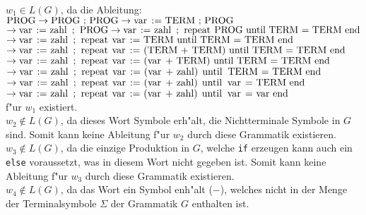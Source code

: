 \documentclass[a4paper,12pt]{article}
\begin{document}

$ w_1 \in L(G) $, da die Ableitung: \\
$ \text{\lstinline|PROG|} \rightarrow \text{\lstinline|PROG ; PROG|} \rightarrow \text{\lstinline|var := TERM ; PROG|} $ \\
$ \rightarrow \text{\lstinline|var := zahl ; PROG|} \rightarrow \text{\lstinline|var := zahl ; repeat PROG until TERM = TERM end|} $ \\
$ \rightarrow \text{\lstinline|var := zahl ; repeat var := TERM until TERM = TERM end |} $ \\
$ \rightarrow \text{\lstinline|var := zahl ; repeat var := (TERM + TERM) until TERM = TERM end |}  $ \\
$ \rightarrow \text{\lstinline|var := zahl ; repeat var := (var + TERM) until TERM = TERM end |}  $ \\
$ \rightarrow \text{\lstinline|var := zahl ; repeat var := (var + zahl) until TERM = TERM end |}  $ \\
$ \rightarrow \text{\lstinline|var := zahl ; repeat var := (var + zahl) until var = TERM end |}  $ \\
$ \rightarrow \text{\lstinline|var := zahl ; repeat var := (var + zahl) until var = var end |}  $ \\
f"ur $ w_1 $ existiert. \\ 

$ w_2 \notin L(G) $, da dieses Wort Symbole erh"alt, die Nichtterminale Symbole in  $ G $ sind. 
Somit kann keine Ableitung f"ur $ w_2 $ durch diese Grammatik existieren. \\

$ w_3 \notin L(G) $, da die einzige Produktion in $ G $, welche \lstinline|if| erzeugen kann auch ein \lstinline|else| voraussetzt, was in diesem Wort nicht gegeben ist.
Somit kann keine Ableitung f"ur $ w_3 $ durch diese Grammatik existieren. \\

$ w_4 \notin L(G) $, da das Wort ein Symbol enh"alt ($ - $), welches nicht in der Menge der Terminalsymbole $ \Sigma $ der Grammatik $ G $ enthalten ist.
\end{document}
